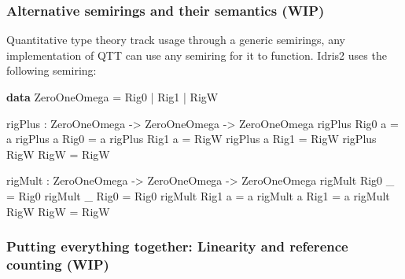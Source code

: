 \documentclass[
]{article}
\newenvironment{Shaded}{}{}
\newcommand{\DataTypeTok}[1]{\textcolor[rgb]{0.56,0.13,0.00}{#1}}
\newcommand{\KeywordTok}[1]{\textcolor[rgb]{0.00,0.44,0.13}{\textbf{#1}}}
\newcommand{\NormalTok}[1]{#1}
\newcommand{\OperatorTok}[1]{\textcolor[rgb]{0.40,0.40,0.40}{#1}}
\newcommand{\OtherTok}[1]{\textcolor[rgb]{0.00,0.44,0.13}{#1}}
\begin{document}
\hypertarget{alternative-semirings-and-their-semantics-wip}{%
\subsubsection{Alternative semirings and their semantics
(WIP)}\label{alternative-semirings-and-their-semantics-wip}}

Quantitative type theory track usage through a generic semirings, any
implementation of QTT can use any semiring for it to function. Idris2
uses the following semiring:

\begin{Shaded}
\begin{Highlighting}[]
\KeywordTok{data} \DataTypeTok{ZeroOneOmega} \OtherTok{=} \DataTypeTok{Rig0} \OperatorTok{|} \DataTypeTok{Rig1} \OperatorTok{|} \DataTypeTok{RigW}

\NormalTok{rigPlus }\OperatorTok{:} \DataTypeTok{ZeroOneOmega} \OtherTok{{-}\textgreater{}} \DataTypeTok{ZeroOneOmega} \OtherTok{{-}\textgreater{}} \DataTypeTok{ZeroOneOmega}
\NormalTok{rigPlus }\DataTypeTok{Rig0}\NormalTok{ a }\OtherTok{=}\NormalTok{ a}
\NormalTok{rigPlus a }\DataTypeTok{Rig0} \OtherTok{=}\NormalTok{ a}
\NormalTok{rigPlus }\DataTypeTok{Rig1}\NormalTok{ a }\OtherTok{=} \DataTypeTok{RigW}
\NormalTok{rigPlus a }\DataTypeTok{Rig1} \OtherTok{=} \DataTypeTok{RigW}
\NormalTok{rigPlus }\DataTypeTok{RigW} \DataTypeTok{RigW} \OtherTok{=} \DataTypeTok{RigW}

\NormalTok{rigMult }\OperatorTok{:} \DataTypeTok{ZeroOneOmega} \OtherTok{{-}\textgreater{}} \DataTypeTok{ZeroOneOmega} \OtherTok{{-}\textgreater{}} \DataTypeTok{ZeroOneOmega}
\NormalTok{rigMult }\DataTypeTok{Rig0}\NormalTok{ \_ }\OtherTok{=} \DataTypeTok{Rig0}
\NormalTok{rigMult \_ }\DataTypeTok{Rig0} \OtherTok{=} \DataTypeTok{Rig0}
\NormalTok{rigMult }\DataTypeTok{Rig1}\NormalTok{ a }\OtherTok{=}\NormalTok{ a}
\NormalTok{rigMult a }\DataTypeTok{Rig1} \OtherTok{=}\NormalTok{ a}
\NormalTok{rigMult }\DataTypeTok{RigW} \DataTypeTok{RigW} \OtherTok{=} \DataTypeTok{RigW}
\end{Highlighting}
\end{Shaded}

\hypertarget{putting-everything-together-linearity-and-reference-counting-wip}{%
\subsubsection{Putting everything together: Linearity and reference
counting
(WIP)}\label{putting-everything-together-linearity-and-reference-counting-wip}}
\end{document}
